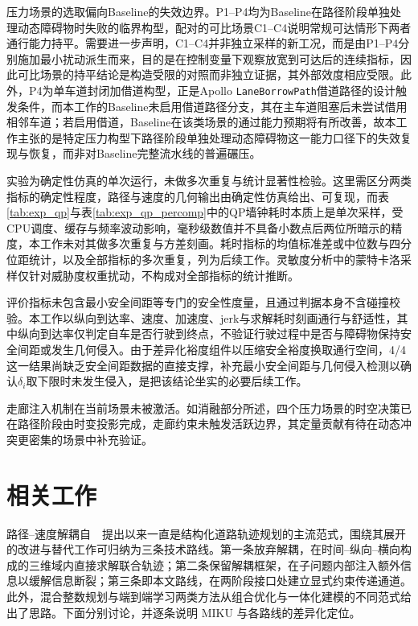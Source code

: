 \documentclass[a4paper,11pt]{ctexart}
\theoremstyle{definition}
\begin{document}
压力场景的选取偏向Baseline的失效边界。P1--P4均为Baseline在路径阶段单独处理动态障碍物时失败的临界构型，配对的可比场景C1--C4说明常规可达情形下两者通行能力持平。需要进一步声明，C1--C4并非独立采样的新工况，而是由P1--P4分别施加最小扰动派生而来，目的是在控制变量下观察放宽到可达后的连续指标，因此可比场景的持平结论是构造受限的对照而非独立证据，其外部效度相应受限。此外，P4为单车道封闭加借道构型，正是Apollo \texttt{LaneBorrowPath}借道路径的设计触发条件，而本工作的Baseline未启用借道路径分支，其在主车道阻塞后未尝试借用相邻车道；若启用借道，Baseline在该类场景的通过能力预期将有所改善，故本工作主张的是特定压力构型下路径阶段单独处理动态障碍物这一能力口径下的失效复现与恢复，而非对Baseline完整流水线的普遍碾压。

实验为确定性仿真的单次运行，未做多次重复与统计显著性检验。这里需区分两类指标的确定性程度，路径与速度的几何输出由确定性仿真给出、可复现，而表\ref{tab:exp_qp}与表\ref{tab:exp_qp_percomp}中的QP墙钟耗时本质上是单次采样，受CPU调度、缓存与频率波动影响，毫秒级数值并不具备小数点后两位所暗示的精度，本工作未对其做多次重复与方差刻画。耗时指标的均值标准差或中位数与四分位距统计，以及全部指标的多次重复，列为后续工作。灵敏度分析中的蒙特卡洛采样仅针对威胁度权重扰动，不构成对全部指标的统计推断。

评价指标未包含最小安全间距等专门的安全性度量，且通过判据本身不含碰撞校验。本工作以纵向到达率、速度、加速度、jerk与求解耗时刻画通行与舒适性，其中纵向到达率仅判定自车是否行驶到终点，不验证行驶过程中是否与障碍物保持安全间距或发生几何侵入。由于差异化裕度组件以压缩安全裕度换取通行空间，4/4 这一结果尚缺乏安全间距数据的直接支撑，补充最小安全间距与几何侵入检测以确认$\delta_i$取下限时未发生侵入，是把该结论坐实的必要后续工作。

走廊注入机制在当前场景未被激活。如消融部分所述，四个压力场景的时空决策已在路径阶段由时变投影完成，走廊约束未触发活跃边界，其定量贡献有待在动态冲突更密集的场景中补充验证。

\section{相关工作}
\label{sec:related}

路径--速度解耦自~\citet{kant1986pvd}~提出以来一直是结构化道路轨迹规划的主流范式，围绕其展开的改进与替代工作可归纳为三条技术路线。第一条放弃解耦，在时间--纵向--横向构成的三维域内直接求解联合轨迹；第二条保留解耦框架，在子问题内部注入额外信息以缓解信息断裂；第三条即本文路线，在两阶段接口处建立显式约束传递通道。此外，混合整数规划与端到端学习两类方法从组合优化与一体化建模的不同范式给出了思路。下面分别讨论，并逐条说明 MIKU 与各路线的差异化定位。
\end{document}

